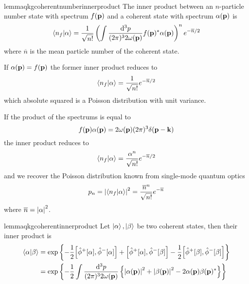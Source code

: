 \begin{restatable}{lemma}{qkgcoherentnumberinnerproduct}\label{thm:qkg_coherent_state_number_state_inner_product}
	The inner product between an $n$-particle number state with spectrum $f(\vb{p})$ and a coherent state with spectrum $\alpha(\vb{p})$ is
	\begin{equation}
		\braket{n_f}{\alpha}
		=
		\frac{1}{\sqrt{n!}}
		\left(
			\int\frac{\dd[3]{p}}{(2\pi)^32\omega(\vb{p})}
			f(\vb{p})^*
			\alpha(\vb{p})
		\right)^n
		e^{-\overline{n}/2}
	\end{equation}
	where $\overline{n}$ is the mean particle number of the coherent state.
\end{restatable}
\begin{corollary}
	If $\alpha(\vb{p})=f(\vb{p})$ the former inner product reduces to
	\begin{equation}
		\braket{n_f}{\alpha}
		=
		\frac{1}{\sqrt{n!}}
		e^{-\overline{n}/2}
	\end{equation}
	which absolute squared is a Poisson distribution with unit variance.
\end{corollary}
\begin{corollary}
	If the product of the spectrums is equal to
	\begin{equation}
		f(\vb{p})
		\alpha(\vb{p})
		=
		2\omega(\vb{p})
		(2\pi)^3
		\delta(\vb{p}-\vb{k})
	\end{equation}
	the inner product reduces to
	\begin{equation}
		\braket{n_f}{\alpha}
		=
		\frac{\alpha^n}{\sqrt{n!}}
		e^{-\overline{n}/2}
	\end{equation}
	and we recover the Poisson distribution known from single-mode quantum optics
	\begin{equation}
		p_n
		=
		\abs{\braket{n_f}{\alpha}}^2
		=
		\frac{\overline{n}^n}{\sqrt{n!}}
		e^{-\overline{n}}
	\end{equation}
	where $\overline{n}=\abs{\alpha}^2$.
\end{corollary}
\begin{restatable}{lemma}{qkgcoherentinnerproduct}\label{thm:coherent_state_inner_product}
	Let $\ket{\alpha},\ket{\beta}$ be two coherent states, then their inner product is
	\begin{equation}
		\begin{split}
			\braket{\alpha}{\beta}
			&=
			\exp\left\{
				-
				\frac{1}{2}
				\comm{\hat\phi^+[\alpha]}{\hat\phi^-[\alpha]}
				+
				\comm{\hat\phi^+[\alpha]}{\hat\phi^-[\beta]}
				-
				\frac{1}{2}
				\comm{\hat\phi^+[\beta]}{\hat\phi^-[\beta]}
			\right\}
			\\
			&=
			\exp\left\{
				-
				\frac{1}{2}
				\int\frac{\dd[3]{p}}{(2\pi)^32\omega(\vb{p})}
				\left\{
					\abs{\alpha(\vb{p})}^2
					+
					\abs{\beta(\vb{p})}^2
					-
					2\alpha(\vb{p})\beta(\vb{p})^*
				\right\}
			\right\}
		\end{split}
	\end{equation}
\end{restatable}
